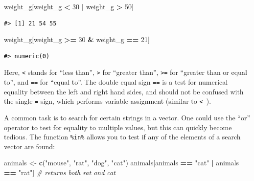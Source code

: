 \documentclass[]{book}
\newenvironment{Shaded}{\begin{snugshade}}{\end{snugshade}}
\newcommand{\KeywordTok}[1]{\textcolor[rgb]{0.13,0.29,0.53}{\textbf{#1}}}
\newcommand{\DecValTok}[1]{\textcolor[rgb]{0.00,0.00,0.81}{#1}}
\newcommand{\StringTok}[1]{\textcolor[rgb]{0.31,0.60,0.02}{#1}}
\newcommand{\CommentTok}[1]{\textcolor[rgb]{0.56,0.35,0.01}{\textit{#1}}}
\newcommand{\OperatorTok}[1]{\textcolor[rgb]{0.81,0.36,0.00}{\textbf{#1}}}
\newcommand{\NormalTok}[1]{#1}
\theoremstyle{definition}
\theoremstyle{definition}
\theoremstyle{remark}
\begin{document}
\begin{Shaded}
\begin{Highlighting}[]
\NormalTok{weight_g[weight_g }\OperatorTok{<}\StringTok{ }\DecValTok{30} \OperatorTok{|}\StringTok{ }\NormalTok{weight_g }\OperatorTok{>}\StringTok{ }\DecValTok{50}\NormalTok{]}
\end{Highlighting}
\end{Shaded}

\begin{verbatim}
#> [1] 21 54 55
\end{verbatim}

\begin{Shaded}
\begin{Highlighting}[]
\NormalTok{weight_g[weight_g }\OperatorTok{>=}\StringTok{ }\DecValTok{30} \OperatorTok{&}\StringTok{ }\NormalTok{weight_g }\OperatorTok{==}\StringTok{ }\DecValTok{21}\NormalTok{]}
\end{Highlighting}
\end{Shaded}

\begin{verbatim}
#> numeric(0)
\end{verbatim}

Here, \texttt{\textless{}} stands for ``less than'',
\texttt{\textgreater{}} for ``greater than'', \texttt{\textgreater{}=}
for ``greater than or equal to'', and \texttt{==} for ``equal to''. The
double equal sign \texttt{==} is a test for numerical equality between
the left and right hand sides, and should not be confused with the
single \texttt{=} sign, which performs variable assignment (similar to
\texttt{\textless{}-}).

A common task is to search for certain strings in a vector. One could
use the ``or'' operator \texttt{\textbar{}} to test for equality to
multiple values, but this can quickly become tedious. The function
\texttt{\%in\%} allows you to test if any of the elements of a search
vector are found:

\begin{Shaded}
\begin{Highlighting}[]
\NormalTok{animals <-}\StringTok{ }\KeywordTok{c}\NormalTok{(}\StringTok{"mouse"}\NormalTok{, }\StringTok{"rat"}\NormalTok{, }\StringTok{"dog"}\NormalTok{, }\StringTok{"cat"}\NormalTok{)}
\NormalTok{animals[animals }\OperatorTok{==}\StringTok{ "cat"} \OperatorTok{|}\StringTok{ }\NormalTok{animals }\OperatorTok{==}\StringTok{ "rat"}\NormalTok{] }\CommentTok{# returns both rat and cat}
\end{Highlighting}
\end{Shaded}
\end{document}
